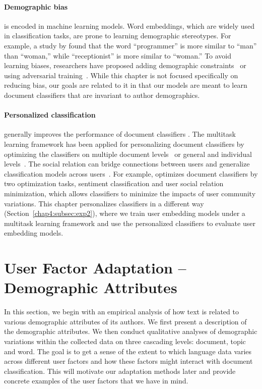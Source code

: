 \paragraph{Demographic bias}
is encoded in machine learning models. Word embeddings, which are widely used in classification tasks, are prone to learning demographic stereotypes. 
For example, a study by \cite{bolukbasi2016man} found that the word ``programmer'' is more similar to ``man'' than ``woman,'' while ``receptionist'' is more similar to ``woman.''
To avoid learning biases, researchers have proposed adding demographic constraints~\cite{zhao2017men} or using adversarial training~\cite{elazar2018adversarial}. 
While this chapter is not focused specifically on reducing bias,
our goals are related to it in that our models are meant to learn document classifiers that are invariant to author demographics.

\paragraph{Personalized classification} 
generally improves the performance of document classifiers \cite{flek2020returning}.
The multitask learning framework has been applied for personalizing document classifiers by optimizing the classifiers on multiple document levels~\cite{benton2017multitask} or general and individual levels~\cite{wu2016personalized}.
The social relation can bridge connections between users and generalize classification models across users~\cite{wu2016personalized, yang2017overcoming}. 
For example, \cite{wu2016personalized} optimizes document classifiers by two optimization tasks, sentiment classification and user social relation minimization, which allows classifiers to minimize the impacts of user community variations.
This chapter personalizes classifiers in a different way (Section~\ref{chap4:subsec:exp2}), where we train user embedding models under a multitask learning framework and use the personalized classifiers to evaluate user embedding models.


\section{User Factor Adaptation -- Demographic Attributes}
\label{chap4:sec:daa}

In this section, we begin with an empirical analysis of how text is related to various demographic attributes of its authors. We first present a description of the demographic attributes. We then conduct qualitative analyses of demographic variations within the collected data on three cascading levels: document, topic and word.
The goal is to get a sense of the extent to which language data varies across different user factors and how these factors might interact with document classification. 
This will motivate our adaptation methods later and provide concrete examples of the user factors that we have in mind.


